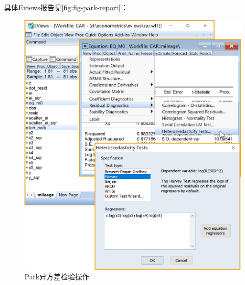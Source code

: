 \documentclass[12pt,(landscape,a4paper),(portrait,a4paper)]{article}
\begin{document}
具体Eviews报告见\ref{fig:fig-park-report}：

\begin{figure}

{\centering \includegraphics[width=24.21in]{picture/lab6-heteroskedasticity/4-test-park1} 

}

\caption{Park异方差检验操作}\label{fig:fig-park-test}
\end{figure}
\end{document}
